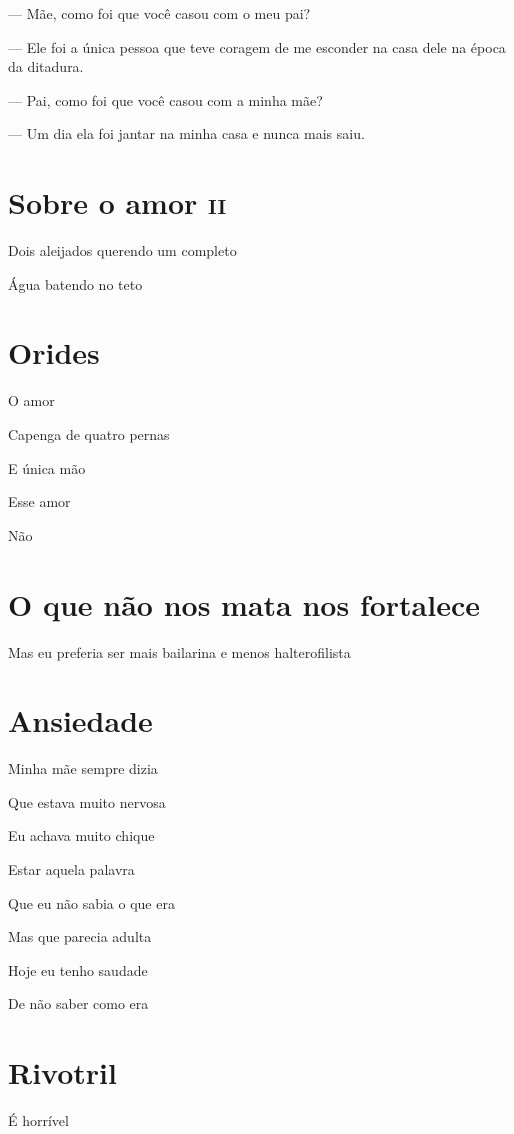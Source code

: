 {\parindent0pt\parskip1pt
— Mãe, como foi que você casou com o meu pai?

— Ele foi a única pessoa que teve coragem de me esconder na casa dele na
época da ditadura.

— Pai, como foi que você casou com a minha mãe?

— Um dia ela foi jantar na minha casa e nunca mais saiu.


\chapter{Sobre o amor \textsc{ii}}

Dois aleijados querendo um completo

Água batendo no teto

\chapter{Orides}

O amor

Capenga de quatro pernas

E única mão

Esse amor

Não

\chapter{O que não nos mata nos fortalece}

Mas eu preferia ser mais bailarina e menos halterofilista

\chapter{Ansiedade}

Minha mãe sempre dizia

Que estava muito nervosa

Eu achava muito chique

Estar aquela palavra 

Que eu não sabia o que era

Mas que parecia adulta\medskip

Hoje eu tenho saudade

De não saber como era

\chapter{Rivotril}

É horrível

}
